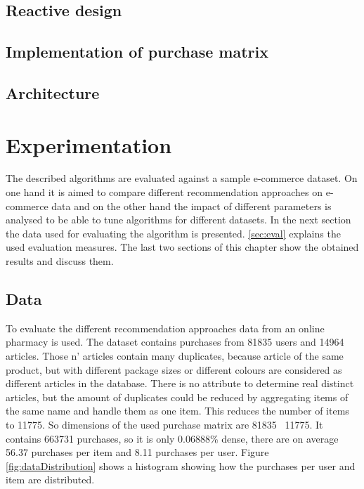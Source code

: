 \documentclass[10pt]{reportMaster}
\begin{document}
\section{Reactive design}

\section{Implementation of purchase matrix}

\section{Architecture}








\chapter{Experimentation}
The described algorithms are evaluated against a sample e-commerce dataset.
On one hand it is aimed to compare different recommendation approaches on e-commerce data and on the other hand the impact of different parameters is analysed to be able to tune algorithms for different datasets.
In the next section the data used for evaluating the algorithm is presented.
\ref{sec:eval} explains the used evaluation measures.
The last two sections of this chapter show the obtained results and discuss them.

\section{Data}
To evaluate the different recommendation approaches data from an online pharmacy is used.
The dataset contains purchases from 81835 users and 14964 articles.
Those n' articles contain many duplicates, because article of the same product, but with different package sizes or different colours are considered as different articles in the database.
There is no attribute to determine real distinct articles, but the amount of duplicates could be reduced by aggregating items of the same name and handle them as one item.
This reduces the number of items to 11775.
So dimensions of the used purchase matrix are 81835 \texttimes \ 11775.
It contains 663731 purchases, so it is only 0.06888\% dense, there are on average 56.37 purchases per item and 8.11 purchases per user. %
Figure \ref{fig:dataDistribution} shows a histogram showing how the purchases per user and item are distributed.
\end{document}
